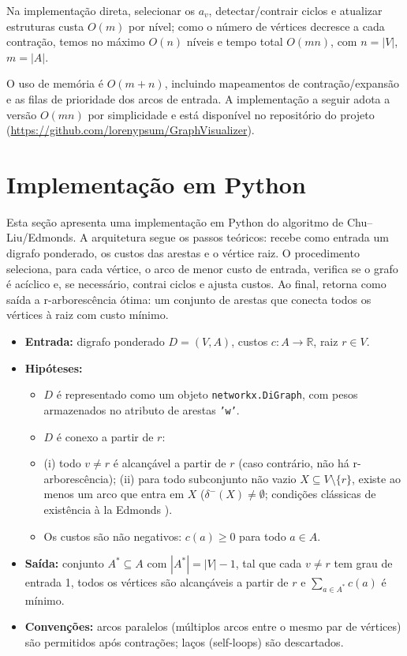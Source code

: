 Na implementação direta, selecionar os \(a_v\), detectar/contrair ciclos e atualizar estruturas custa \(O(m)\) por nível; como o número de vértices decresce a cada contração, temos no máximo \(O(n)\) níveis e tempo total \(O(mn)\), com \(n=|V|\), \(m=|A|\).

O uso de memória é \(O(m+n)\), incluindo mapeamentos de contração/expansão e as filas de prioridade dos arcos de entrada. A implementação a seguir adota a versão \(O(mn)\) por simplicidade e está disponível no repositório do projeto (\url{https://github.com/lorenypsum/GraphVisualizer}).

\section{Implementação em Python}


Esta seção apresenta uma implementação em Python do algoritmo de Chu–Liu/Edmonds. A arquitetura segue os passos teóricos: recebe como entrada um digrafo ponderado, os custos das arestas e o vértice raiz. O procedimento seleciona, para cada vértice, o arco de menor custo de entrada, verifica se o grafo é acíclico e, se necessário, contrai ciclos e ajusta custos. Ao final, retorna como saída a r-arborescência ótima: um conjunto de arestas que conecta todos os vértices à raiz com custo mínimo.

\begin{itemize}\setlength{\itemsep}{2pt}
    \item \textbf{Entrada:} digrafo ponderado \(D=(V,A)\), custos \(c:A\to\mathbb{R}\), raiz \(r\in V\).
    \item \textbf{Hipóteses:}
          \begin{itemize}\setlength{\itemsep}{2pt}
              \item \(D\) é representado como um objeto \texttt{networkx.DiGraph}, com pesos armazenados no atributo de arestas \texttt{'w'}.
              \item \(D\) é conexo a partir de \(r\):
              \item (i) todo \(v\neq r\) é alcançável a partir de \(r\) (caso contrário, não há r-arborescência); (ii) para todo subconjunto não vazio \(X\subseteq V\setminus\{r\}\), existe ao menos um arco que entra em \(X\) (\(\delta^-(X)\neq\emptyset\); condições clássicas de existência \`a la Edmonds \cite{schrijver2003comb}).
              \item Os custos são não negativos: \(c(a)\ge 0\) para todo \(a\in A\).
          \end{itemize}
    \item \textbf{Saída:} conjunto \(A^*\subseteq A\) com \(|A^*|=|V|-1\), tal que cada \(v\neq r\) tem grau de entrada 1, todos os vértices são alcançáveis a partir de \(r\) e \(\sum_{a\in A^*} c(a)\) é mínimo.
    \item \textbf{Convenções:} arcos paralelos (múltiplos arcos entre o mesmo par de vértices) são permitidos após contrações; laços (self-loops) são descartados.
\end{itemize}


